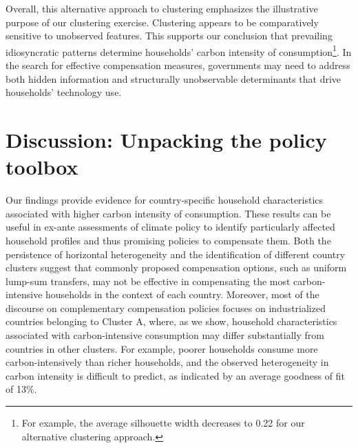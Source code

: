 \documentclass[12pt, a4paper]{article}
\begin{document}
Overall, this alternative approach to clustering emphasizes the illustrative purpose of our clustering exercise. Clustering appears to be comparatively sensitive to unobserved features. This supports our conclusion that prevailing idiosyncratic patterns determine households' carbon intensity of consumption\footnote{For example, the average silhouette width decreases to 0.22 for our alternative clustering approach.}. In the search for effective compensation measures, governments may need to address both hidden information and structurally unobservable determinants that drive households' technology use.

\section{Discussion: Unpacking the policy toolbox} \label{sec:discussion}

Our findings provide evidence for country-specific household characteristics associated with higher carbon intensity of consumption. These results can be useful in ex-ante assessments of climate policy to identify particularly affected household profiles and thus promising policies to compensate them. Both the persistence of horizontal heterogeneity and the identification of different country clusters suggest that commonly proposed compensation options, such as uniform lump-sum transfers, may not be effective in compensating the most carbon-intensive households in the context of each country. Moreover, most of the discourse on complementary compensation policies focuses on industrialized countries belonging to Cluster A, where, as we show, household characteristics associated with carbon-intensive consumption may differ substantially from countries in other clusters. For example, poorer households consume more carbon-intensively than richer households, and the observed heterogeneity in carbon intensity is difficult to predict, as indicated by an average goodness of fit of 13\%.
\end{document}

